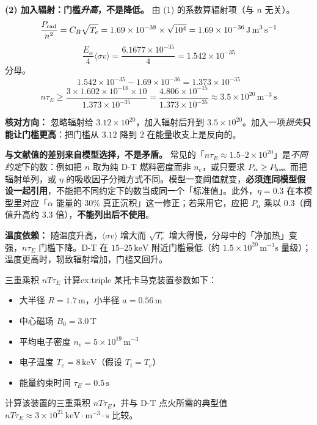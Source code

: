 \textbf{(2) 加入辐射：门槛\emph{升高}，不是降低。} 由 (1) 的系数算辐射项（与 $n$ 无关）。
\[
    \frac{P_{\rm rad}}{n^2} = C_B\sqrt{T_e} = 1.69\times10^{-38}\times\sqrt{10^4} = 1.69\times10^{-36}\,\mathrm{J\,m^3\,s^{-1}}
\]
\[
    \frac{E_\alpha}{4}\langle\sigma v\rangle = \frac{6.1677\times10^{-35}}{4} = 1.542\times10^{-35}
\]
分母。
\[
    1.542\times10^{-35} - 1.69\times10^{-36} = 1.373\times10^{-35}
\]
\[
    n\tau_E \ge \frac{3\times1.602\times10^{-16}\times10}{1.373\times10^{-35}}
    = \frac{4.806\times10^{-15}}{1.373\times10^{-35}} \approx \boxed{3.5\times10^{20}\,\mathrm{m^{-3}\,s}}
\]

\textbf{核对方向：} 忽略辐射给 $3.12\times10^{20}$，加入辐射后升到 $3.5\times10^{20}$。加入一项\emph{损失}\textbf{只能让门槛更高}：把门槛从 $3.12$ 降到 $2$ 在能量收支上是反向的。

\textbf{与文献值的差别来自模型选择，不是矛盾。} 常见的「$n\tau_E\approx1.5\text{--}2\times10^{20}$」是\emph{不同约定}下的数：例如把 $n$ 取为纯 D-T 燃料密度而非 $n_e$，或只要求 $P_\alpha\ge P_{\rm loss}$ 而把辐射单列，或 $\eta$ 的吸收因子分摊方式不同。模型一变阈值就变，\textbf{必须连同模型假设一起引用}，不能把不同约定下的数当成同一个「标准值」。此外，$\eta=0.3$ 在本模型里对应「$\alpha$ 能量的 30\% 真正沉积」这一修正；若采用它，应把 $P_\alpha$ 乘以 0.3（阈值升高约 3.3 倍），\textbf{不能列出后不使用}。

\textbf{温度依赖：} 随温度升高，$\langle\sigma v\rangle$ 增大而 $\sqrt{T_e}$ 增大得慢，分母中的「净加热」变强，$n\tau_E$ 门槛下降。D-T 在 $15\text{--}25\,\mathrm{keV}$ 附近门槛最低（约 $1.5\times10^{20}\,\mathrm{m^{-3}s}$ 量级）；温度更高时，轫致辐射增加，门槛又回升。


\begin{example}{三重乘积 $nT\tau_E$ 计算}{ex:triple}
某托卡马克装置参数如下：
\begin{itemize}
    \item 大半径 $R=1.7\,\mathrm{m}$，小半径 $a=0.56\,\mathrm{m}$
    \item 中心磁场 $B_0=3.0\,\mathrm{T}$
    \item 平均电子密度 $n_e=5\times10^{19}\,\mathrm{m^{-3}}$
    \item 电子温度 $T_e=8\,\mathrm{keV}$（假设 $T_i=T_e$）
    \item 能量约束时间 $\tau_E=0.5\,\mathrm{s}$
\end{itemize}
计算该装置的三重乘积 $nT\tau_E$，并与 D-T 点火所需的典型值 $nT\tau_E\approx 3\times10^{21}\,\mathrm{keV\cdot m^{-3}\cdot s}$ 比较。
\end{example}

